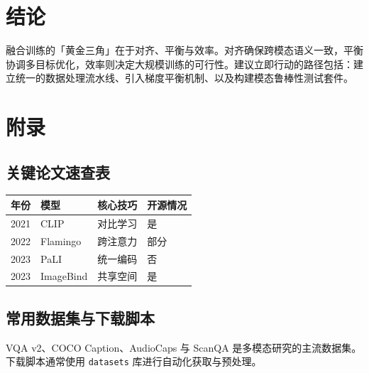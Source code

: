 \chapter{结论}
融合训练的「黄金三角」在于对齐、平衡与效率。对齐确保跨模态语义一致，平衡协调多目标优化，效率则决定大规模训练的可行性。建议立即行动的路径包括：建立统一的数据处理流水线、引入梯度平衡机制、以及构建模态鲁棒性测试套件。\par
\chapter{附录}
\section{关键论文速查表}
\begin{table}[H]
\centering
\begin{tabular}{|l|l|l|l|}
\hline
年份 & 模型 & 核心技巧 & 开源情况 \\
\hline
2021 & CLIP & 对比学习 & 是 \\
\hline
2022 & Flamingo & 跨注意力 & 部分 \\
\hline
2023 & PaLI & 统一编码 & 否 \\
\hline
2023 & ImageBind & 共享空间 & 是 \\
\hline
\end{tabular}
\end{table}
\section{常用数据集与下载脚本}
VQA v2、COCO Caption、AudioCaps 与 ScanQA 是多模态研究的主流数据集。下载脚本通常使用 \texttt{datasets} 库进行自动化获取与预处理。\par
